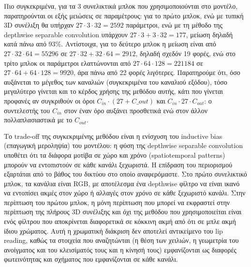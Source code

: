Πιο συγκεκριμένα, για τα 3 συνελικτικά μπλοκ που χρησιμοποιούνται στο μοντέλο, παρατηρούνται οι εξής μειώσεις σε παραμέτρους: για το πρώτο μπλοκ, ενώ με τυπική 3D συνέλιξη θα υπήρχαν $27\cdot3\cdot32 = 2592$ παράμετροι, ενώ με τη μέθοδο της depthwise separable convolution υπάρχουν $27\cdot3+3\cdot32 = 177$, μείωση δηλαδή κατά πάνω από 93\%. Αντίστοιχα, για το δεύτερο μπλοκ η μείωση είναι από $27\cdot32\cdot64 = 55296$ σε $27\cdot32 + 32\cdot64 = 2912$, δηλαδή σχεδόν 19 φορές, ενώ στο τρίτο μπλοκ οι παράμετροι ελαττώνονται από $27\cdot64\cdot128 = 221184$ σε $27\cdot64 + 64\cdot128 = 9920$, άρα πάνω από 22 φορές λιγότερες. Παρατηρούμε ότι, όσο αυξάνεται το μέγεθος των καναλιών (συγκεκριμένα του καναλιού εξόδου), τόσο μεγαλύτερο γίνεται και το κέρδος χρήσης της μεθόδου αυτής, κάτι που γίνεται προφανές αν συγκριθούν οι όροι $C_{in}\cdot(27+C\_{out})$ και $C_{in}\cdot27\cdot C_{out}$: ο συντελεστής του $C_{in}$ στον έναν όρο αυξάνει προσθετικά ενώ στον άλλον πολλαπλασιαστικά με το $C_{out}$.

Το trade-off της συγκεκριμένης μεθόδου είναι η ενίσχυση του inductive bias (επαγωγική μεροληψία) του μοντέλου: η φύση της depthwise separable convolution υποθέτει ότι τα διάφορα μοτίβα σε χώρο και χρόνο (spatiotemporal patterns) μπορούν να εντοπιστούν σε κάθε κανάλι ξεχωριστά. Η επίδραση του περιορισμού εξαρτάται από το βάθος του δικτύου στο οποίο αναφερόμαστε. Στο πρώτο συνελικτικό μπλοκ, τα κανάλια είναι RGB, με αποτέλεσμα ένα depthwise φίλτρο να είναι ικανό να εντοπίσει ακμές στον χώρο ή αλλαγές στον χρόνο σε κάθε ξεχωριστό κανάλι. Στην περίπτωση του πρώτου μπλοκ, η μόνη περίπτωση που μπορεί να εκφραστεί στην περίπτωση της πλήρους 3D συνέλιξης και όχι της μεθόδου που χρησιμοποιείται είναι ενός φίλτρου που αποκρίνεται διαφορετικά σε κόκκινη ακμή από ότι σε μπλε ακμή ίδιου χρώματος. Αυτή η χρωματική διάκριση δεν αποτελεί αντικείμενο του lip reading, καθώς τα στοιχεία που αναζητώνται (η θέση των χειλιών, η γεωμετρία του ανοίγματος και του κλεισίματός τους και η κίνησή τους) εμφανίζονται ως διαφορές φωτεινότητας και σχήματος που εμφανίζονται σε κάθε κανάλι.

